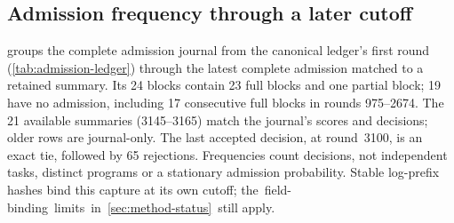 \subsection{Admission frequency through a later cutoff}\label{app:candidate-retained-trace}

 groups the complete admission journal
from the canonical ledger's first round (\cref{tab:admission-ledger}) through
the latest complete admission matched to a retained summary. Its 24 blocks
contain 23 full blocks and one partial block; 19 have no admission, including
17 consecutive full blocks in rounds 975--2674. The 21 available summaries
(3145--3165) match the journal's scores and decisions; older rows are journal-only.
The last accepted decision, at round~3100, is an exact tie, followed by
65 rejections. Frequencies count decisions, not independent tasks, distinct
programs or a stationary admission probability. Stable log-prefix hashes bind
this capture at its own cutoff; \mbox{the field-binding limits in
\cref{sec:method-status} still} apply.
